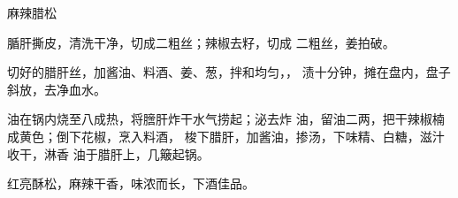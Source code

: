 \begin{recipe}{麻辣腊松}

\ingredients



\cooking

\step 	腯肝撕皮，清洗干净，切成二粗丝；辣椒去籽，切成 二粗丝，姜拍破。

\step 	切好的腊肝丝，加酱油、料酒、姜、葱，拌和均匀，， 渍十分钟，摊在盘内，盘子斜放，去净血水。

\step 	油在锅内烧至八成热，将膪肝炸干水气捞起；泌去炸 油，留油二两，把干辣椒楠成黄色；倒下花椒，烹入料酒， 梭下腊肝，加酱油，掺汤，下味精、白糖，滋汁收干，淋香 油于腊肝上，几簸起锅。

\notes

红亮酥松，麻辣干香，味浓而长，下酒佳品。

\end{recipe}


